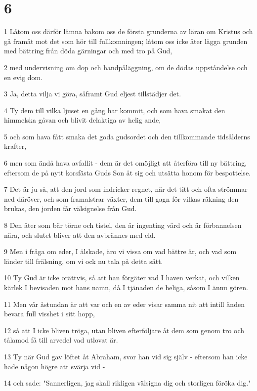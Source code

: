 \chapter{6}

\par 1 Låtom oss därför lämna bakom oss de första grunderna av läran om Kristus och gå framåt mot det som hör till fullkomningen; låtom oss icke åter lägga grunden med bättring från döda gärningar och med tro på Gud,
\par 2 med undervisning om dop och handpåläggning, om de dödas uppståndelse och en evig dom.
\par 3 Ja, detta vilja vi göra, såframt Gud eljest tillstädjer det.
\par 4 Ty dem till vilka ljuset en gång har kommit, och som hava smakat den himmelska gåvan och blivit delaktiga av helig ande,
\par 5 och som hava fått smaka det goda gudsordet och den tillkommande tidsålderns krafter,
\par 6 men som ändå hava avfallit - dem är det omöjligt att återföra till ny bättring, eftersom de på nytt korsfästa Guds Son åt sig och utsätta honom för bespottelse.
\par 7 Det är ju så, att den jord som indricker regnet, när det titt och ofta strömmar ned däröver, och som framalstrar växter, dem till gagn för vilkas räkning den brukas, den jorden får välsignelse från Gud.
\par 8 Den åter som bär törne och tistel, den är ingenting värd och är förbannelsen nära, och slutet bliver att den avbrännes med eld.
\par 9 Men i fråga om eder, I älskade, äro vi vissa om vad bättre är, och vad som länder till frälsning, om vi ock nu tala på detta sätt.
\par 10 Ty Gud är icke orättvis, så att han förgäter vad I haven verkat, och vilken kärlek I bevisaden mot hans namn, då I tjänaden de heliga, såsom I ännu gören.
\par 11 Men vår åstundan är att var och en av eder visar samma nit att intill änden bevara full visshet i sitt hopp,
\par 12 så att I icke bliven tröga, utan bliven efterföljare åt dem som genom tro och tålamod få till arvedel vad utlovat är.
\par 13 Ty när Gud gav löftet åt Abraham, svor han vid sig själv - eftersom han icke hade någon högre att svärja vid -
\par 14 och sade: "Sannerligen, jag skall rikligen välsigna dig och storligen föröka dig."

